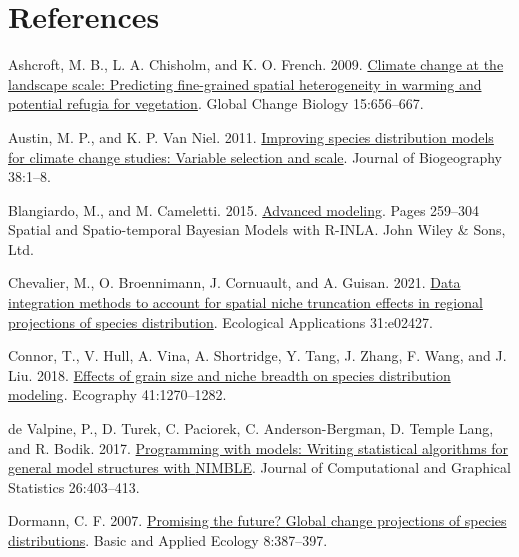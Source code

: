 \documentclass[
  12pt,
  a4paper]{article}
\newlength{\cslhangindent}
\newlength{\cslentryspacingunit} %
\newenvironment{CSLReferences}[2] %
 {%
  \setlength{\parindent}{0pt}
  \ifodd #1
  \let\oldpar\par
  \def\par{\hangindent=\cslhangindent\oldpar}
  \fi
  \setlength{\parskip}{#2\cslentryspacingunit}
 }%
 {}
\begin{document}
\hypertarget{references}{%
\section{References}\label{references}}

\hypertarget{refs}{}
\begin{CSLReferences}{1}{0}
\leavevmode{}%
Ashcroft, M. B., L. A. Chisholm, and K. O. French. 2009. \href{https://doi.org/10.1111/j.1365-2486.2008.01762.x}{Climate change at the landscape scale: Predicting fine-grained spatial heterogeneity in warming and potential refugia for vegetation}. Global Change Biology 15:656--667.

\leavevmode{}%
Austin, M. P., and K. P. Van Niel. 2011. \href{https://doi.org/10.1111/j.1365-2699.2010.02416.x}{Improving species distribution models for climate change studies: Variable selection and scale}. Journal of Biogeography 38:1--8.

\leavevmode{}%
Blangiardo, M., and M. Cameletti. 2015. \href{https://doi.org/10.1002/9781118950203.ch8}{Advanced modeling}. Pages 259--304 Spatial and {Spatio}-temporal {Bayesian} {Models} with {R}-{INLA}. John Wiley \& Sons, Ltd.

\leavevmode{}%
Chevalier, M., O. Broennimann, J. Cornuault, and A. Guisan. 2021. \href{https://doi.org/10.1002/eap.2427}{Data integration methods to account for spatial niche truncation effects in regional projections of species distribution}. Ecological Applications 31:e02427.

\leavevmode{}%
Connor, T., V. Hull, A. Vina, A. Shortridge, Y. Tang, J. Zhang, F. Wang, and J. Liu. 2018. \href{https://doi.org/10.1111/ecog.03416}{Effects of grain size and niche breadth on species distribution modeling}. Ecography 41:1270--1282.

\leavevmode{}%
de Valpine, P., D. Turek, C. Paciorek, C. Anderson-Bergman, D. Temple Lang, and R. Bodik. 2017. \href{https://doi.org/10.1080/10618600.2016.1172487}{Programming with models: Writing statistical algorithms for general model structures with {NIMBLE}}. Journal of Computational and Graphical Statistics 26:403--413.

\leavevmode{}%
Dormann, C. F. 2007. \href{https://doi.org/10.1016/j.baae.2006.11.001}{Promising the future? {Global} change projections of species distributions}. Basic and Applied Ecology 8:387--397.


\end{CSLReferences}
\end{document}
